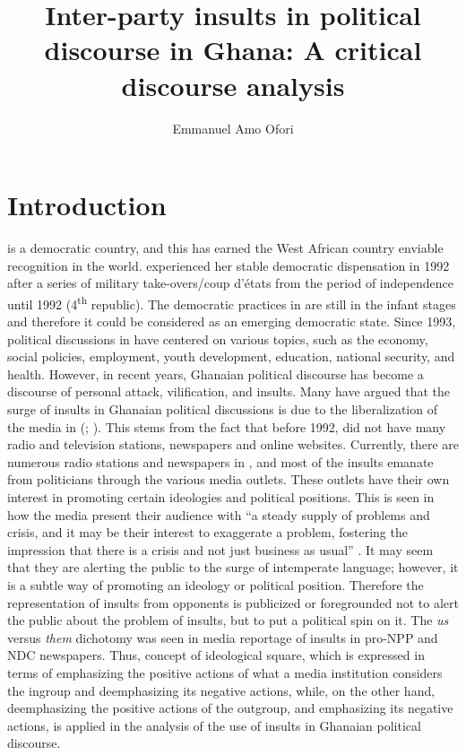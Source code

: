 \documentclass[output=paper,modfonts]{langscibook}
\title{Inter-party insults in political discourse in Ghana: A critical discourse analysis}
\author{Emmanuel Amo Ofori\affiliation{University of Florida/University of Cape Coast} }
\begin{document}
\maketitle
 
 

 

\section{Introduction}\label{sec:ofori:1}

 is a democratic country, and this has earned the West African country enviable recognition in the world.  experienced her stable democratic dispensation in 1992 after a series of military take-overs/coup d’états from the period of independence until 1992 (4\textsuperscript{th} republic). The democratic practices in  are still in the infant stages and therefore it could be considered as an emerging democratic state. Since 1993, political discussions in  have centered on various topics, such as the economy, social policies, employment, youth development, education, national security, and health. However, in recent years, Ghanaian political discourse has become a discourse of personal attack, vilification, and insults. Many have argued that the surge of insults in Ghanaian political discussions is due to the liberalization of the media in  (\citealt{Owusu2012}; \citealt{Marfo2014}). This stems from the fact that before 1992,  did not have many radio and television stations, newspapers and online websites. Currently, there are numerous radio stations and newspapers in , and most of the insults emanate from politicians through the various media outlets. These outlets have their own interest in promoting certain ideologies and political positions. This is seen in how the media present their audience with “a steady supply of problems and crisis, and it may be their interest to exaggerate a problem, fostering the impression that there is a crisis and not just business as usual” \citep[83]{Cameron2012}. It may seem that they are alerting the public to the surge of intemperate language; however, it is a subtle way of promoting an ideology or political position. Therefore the representation of insults from opponents is publicized or foregrounded not to alert the public about the problem of insults, but to put a political spin on it. The \textit{us} versus \textit{them} dichotomy was seen in media reportage of insults in pro-NPP and NDC newspapers. Thus,  concept of ideological square, which is expressed in terms of emphasizing the positive actions of what a media institution considers the ingroup and deemphasizing its negative actions, while, on the other hand, deemphasizing the positive actions of the outgroup, and emphasizing its negative actions, is applied in the analysis of the use of insults in Ghanaian political discourse.
\end{document}
